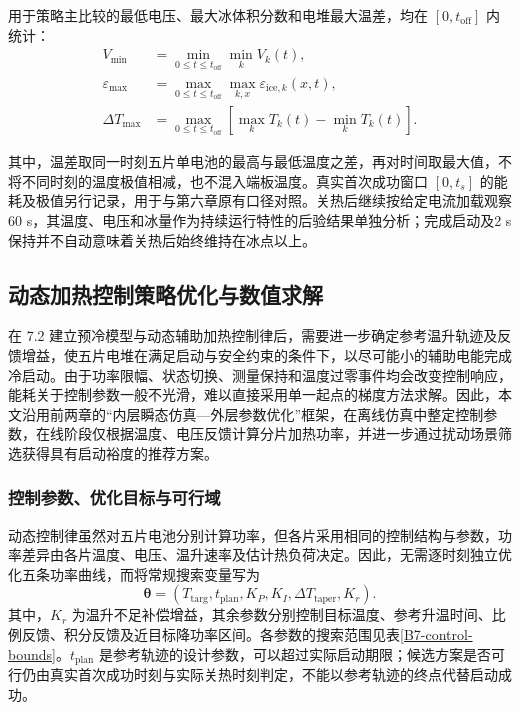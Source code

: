 \documentclass[bwprint]{gmcmthesis}
\numberwithin{figure}{section}
\begin{document}
用于策略主比较的最低电压、最大冰体积分数和电堆最大温差，均在 $[0,t_{\mathrm{off}}]$ 内统计：
\begin{equation}
\begin{aligned}
V_{\min}&=\min_{0\leq t\leq t_{\mathrm{off}}}\min_kV_k(t),\\
\varepsilon_{\max}&=\max_{0\leq t\leq t_{\mathrm{off}}}\max_{k,x}\varepsilon_{\mathrm{ice},k}(x,t),\\
\Delta T_{\max}&=\max_{0\leq t\leq t_{\mathrm{off}}}
\left[\max_kT_k(t)-\min_kT_k(t)\right].
\end{aligned}
\tag{7-35}\label{eq:q4:comparison_metrics}
\end{equation}

其中，温差取同一时刻五片单电池的最高与最低温度之差，再对时间取最大值，不将不同时刻的温度极值相减，也不混入端板温度。真实首次成功窗口 $[0,t_s]$ 的能耗及极值另行记录，用于与第六章原有口径对照。关热后继续按给定电流加载观察60 s，其温度、电压和冰量作为持续运行特性的后验结果单独分析；完成启动及2 s保持并不自动意味着关热后始终维持在冰点以上。

\subsection{动态加热控制策略优化与数值求解}
在 7.2 建立预冷模型与动态辅助加热控制律后，需要进一步确定参考温升轨迹及反馈增益，使五片电堆在满足启动与安全约束的条件下，以尽可能小的辅助电能完成冷启动。由于功率限幅、状态切换、测量保持和温度过零事件均会改变控制响应，能耗关于控制参数一般不光滑，难以直接采用单一起点的梯度方法求解。因此，本文沿用前两章的“内层瞬态仿真—外层参数优化”框架，在离线仿真中整定控制参数，在线阶段仅根据温度、电压反馈计算分片加热功率，并进一步通过扰动场景筛选获得具有启动裕度的推荐方案。

\subsubsection{控制参数、优化目标与可行域}
动态控制律虽然对五片电池分别计算功率，但各片采用相同的控制结构与参数，功率差异由各片温度、电压、温升速率及估计热负荷决定。因此，无需逐时刻独立优化五条功率曲线，而将常规搜索变量写为
\begin{equation}
\boldsymbol{\theta}=\left(T_{\mathrm{targ}},t_{\mathrm{plan}},K_P,K_I,\Delta T_{\mathrm{taper}},K_r\right).
\tag{7-36}\label{eq:q4:solver_parameters}
\end{equation}
其中，\(K_r\) 为温升不足补偿增益，其余参数分别控制目标温度、参考升温时间、比例反馈、积分反馈及近目标降功率区间。各参数的搜索范围见表\ref{B7-control-bounds}。\(t_{\mathrm{plan}}\) 是参考轨迹的设计参数，可以超过实际启动期限；候选方案是否可行仍由真实首次成功时刻与实际关热时刻判定，不能以参考轨迹的终点代替启动成功。
\end{document}
